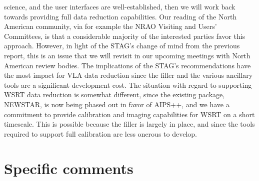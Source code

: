 science, and the user interfaces are well-established, then we will
work back towards providing full data reduction capabilities. Our
reading of the North American community, via for example the NRAO
Visiting and Users' Committees, is that a considerable majority of the
interested parties favor this approach. However, in light of the
STAG's change of mind from the previous report, this is an issue that
we will revisit in our upcoming meetings with North American review
bodies.  The implications of the STAG's recommendations have the most
impact for VLA data reduction since the filler and the various
ancillary tools are a significant development cost. The situation with
regard to supporting WSRT data reduction is somewhat different, since
the existing package, NEWSTAR, is now being phased out in favor of
AIPS++, and we have a commitment to provide calibration and imaging
capabilities for WSRT on a short timescale. This is possible because
the filler is largely in place, and since the tools required to
support full calibration are less onerous to develop.

\section{Specific comments}

